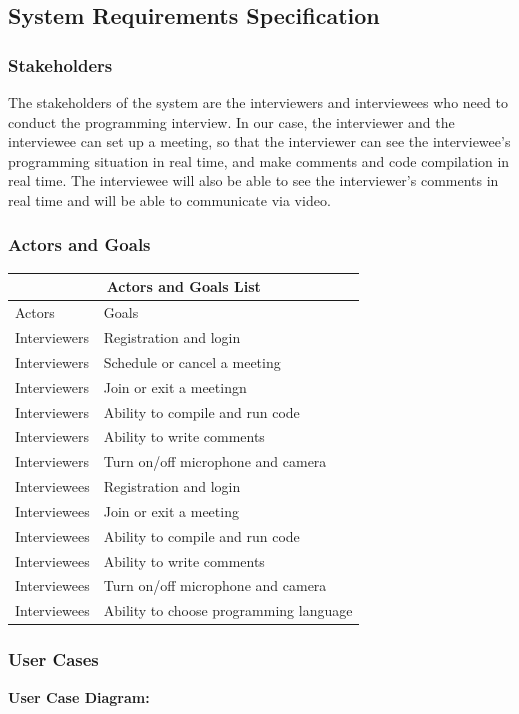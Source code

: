 \documentclass{article}
\begin{document}
   \subsection{System Requirements Specification}
   \subsubsection*{Stakeholders}
   The stakeholders of the system are the interviewers and interviewees who need to conduct the programming interview. In our case, the interviewer and the interviewee can set up a meeting, so that the interviewer can see the interviewee's programming situation in real time, and make comments and code compilation in real time. The interviewee will also be able to see the interviewer's comments in real time and will be able to communicate via video.
   \subsubsection*{Actors and Goals}
   \begin{tabular}{ |p{3cm}||p{6.5cm}|  }
    \hline
    \multicolumn{2}{|c|}{Actors and Goals List} \\
    \hline
    Actors & Goals\\
    \hline
    Interviewers   & Registration and login\\
    Interviewers   & Schedule or cancel a meeting\\
    Interviewers   & Join or exit a meetingn\\
    Interviewers   & Ability to compile and run code\\
    Interviewers   & Ability to write comments\\
    Interviewers   & Turn on/off microphone and camera\\
    Interviewees   & Registration and login\\
    Interviewees   & Join or exit a meeting\\
    Interviewees   & Ability to compile and run code\\
    Interviewees   & Ability to write comments\\
    Interviewees   & Turn on/off microphone and camera\\
    Interviewees   & Ability to choose programming language\\
    \hline
   \end{tabular}

   \subsubsection*{User Cases}
   \textbf{User Case Diagram: }
\end{document}

